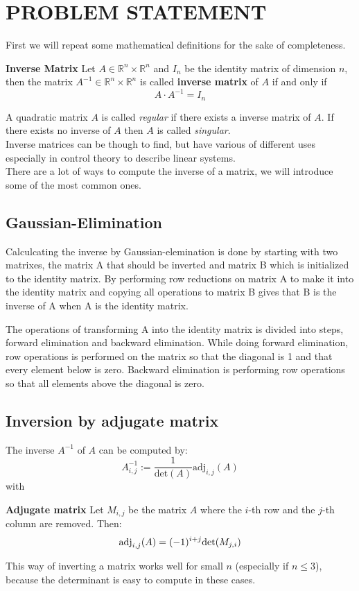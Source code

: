 

\section{PROBLEM STATEMENT}\label{sec:problem}
First we will repeat some mathematical definitions for the sake of completeness.
\begin{definition}
	\textbf{Inverse Matrix}
	Let $A \in \mathbb{R}^n \times \mathbb{R}^n$ and $I_n$ be the identity matrix of dimension $n$, then the matrix $A^{-1} \in \mathbb{R}^n \times \mathbb{R}^n$ is called \textbf{inverse matrix} of $A$ if and only if
	\begin{equation}\label{eq:inverse}
	A \cdot A^{-1} = I_n
	\end{equation}
\end{definition}
A quadratic matrix $A$ is called \emph{regular} if there exists a inverse matrix of $A$. If there exists no inverse of $A$ then $A$ is called \emph{singular}.\\
Inverse matrices can be though to find, but have various of different uses especially in control theory to describe linear systems.  
\vspace{0.2cm}\\
There are a lot of ways to compute the inverse of a matrix, we will introduce some of the most common ones.\\
\subsection*{Gaussian-Elimination}
Calculcating the inverse by Gaussian-elemination is done by starting with two matrixes, the matrix A that should be inverted and matrix B which is initialized to the identity matrix. By performing row reductions on matrix A to make it into the identity matrix and copying all operations to matrix B gives that B is the inverse of A when A is the identity matrix.

The operations of transforming A into the identity matrix is divided into steps, forward elimination and backward elimination.
While doing forward elimination, row operations is performed on the matrix so that the diagonal is 1 and that every element below is zero.
Backward elimination is performing row operations so that all elements above the diagonal is zero.

\subsection*{Inversion by adjugate matrix}
The inverse $A^{-1}$ of $A$ can be computed by:
\begin{equation}
	A^{-1}_{i,j} := \frac{1}{\text{det}(A)} \text{adj}_{i,j}(A)
\end{equation}
with
\begin{definition}
	\textbf{Adjugate matrix} Let $M_{i,j}$ be the matrix $A$ where the $i$-th row and the $j$-th column are removed. Then:
	\[ \text{\textnormal{adj}}_{i,j}(A) = (-1)^{i+j} \text{\textnormal{det}}(M_{j,i}) \]
\end{definition}
This way of inverting a matrix works well for small $n$ (especially if $n \leq 3$), because the determinant is easy to compute in these cases.\\

